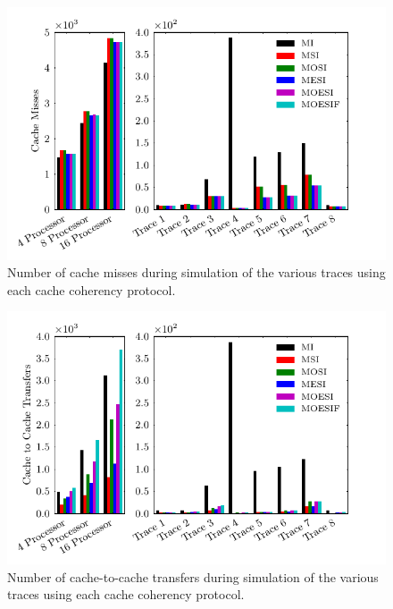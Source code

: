 \documentclass{article}
\newcommand\figsize{.9\linewidth}
\begin{document}
  \begin{figure}[htbp]
    \label{fig:misses}
    \centering
    \begin{minipage}[t]{\figsize}
      \centering
      \includegraphics[width=\linewidth]{../runs/plots/misses}
      \caption{Number of cache misses during simulation of the various
        traces using each cache coherency protocol.}
    \end{minipage}
  \end{figure}

  \begin{figure}[htbp]
    \label{fig:transfers}
    \centering
    \begin{minipage}[t]{\figsize}
      \centering
      \includegraphics[width=\linewidth]{../runs/plots/transfers}
      \caption{Number of cache-to-cache transfers during simulation of
        the various traces using each cache coherency protocol.}
    \end{minipage}
  \end{figure}
\end{document}
